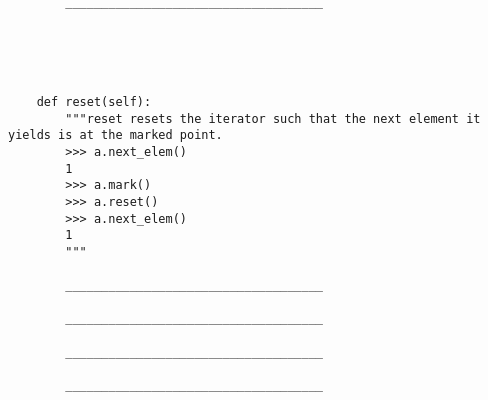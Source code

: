 \documentclass{exam}
\begin{document}
\begin{questions}
\begin{lstlisting}
        ____________________________________
            




    def reset(self):
        """reset resets the iterator such that the next element it yields is at the marked point.
        >>> a.next_elem()
        1   
        >>> a.mark()
        >>> a.reset()
        >>> a.next_elem()
        1 
        """
        
        ____________________________________
        
        ____________________________________
        
        ____________________________________
        
        ____________________________________
\end{lstlisting}

\end{questions}


\newpage
\end{document}
